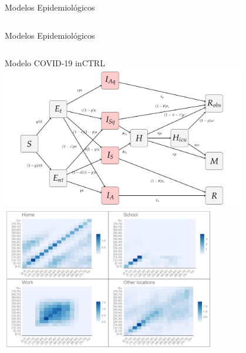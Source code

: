 \documentclass[pdf]
{beamer}
\begin{document}
\begin{frame}{Modelos Epidemiológicos}
\begin{columns}
\begin{column}[T]{0.5\textwidth}
	\end{column}
\end{columns}
\end{frame}

\begin{frame}{Modelos Epidemiológicos}
\begin{columns}
	\begin{column}[T]{0.6\textwidth}
		\centering
		\vspace{0.6cm}
		\alert{\large Modelo COVID-19 inCTRL}\\
		\vspace{0.5cm}
		\includegraphics[width=0.8\textwidth]{Imagens/InCTRL_model.png}\\
		\vspace{0.5cm}
		\includegraphics[width=0.7\textwidth]{Imagens/Cont_Matrix.png}\\
	\end{column}
	

\end{columns}
\end{frame}
\end{document}

